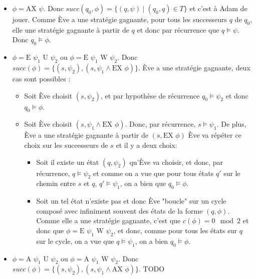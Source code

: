 \documentclass[10pt,a4paper]{article}
\begin{document}
\begin{itemize}
\item $\phi = \mbox{AX } \psi$. Donc $succ(q_0, \phi) = \{ (q, \psi) \mid (q_0,q) \in T \} $ et c'est à Adam de jouer. Comme Ève a une stratégie gagnante, pour tous les successeurs $q$ de $q_0$, elle une stratégie gagnante à partir de $q$ et donc par récurrence que $q \vDash \psi$. Donc $q_0 \vDash \phi$.

\item $\phi = \mbox{E } \psi_1 \mbox{ U } \psi_2$ ou $\phi = \mbox{E } \psi_1 \mbox{ W } \psi_2$. Donc $succ(\phi) = \{ (s,\psi_2), (s, \psi_1 \land \mbox{EX } \phi) \}$. Ève a une stratégie gagnante, deux cas sont possibles :
\begin{itemize}
	\item Soit Ève choisit $(s,\psi_2)$, et par hypothèse de récurrence $q_0 \vDash \psi_2$ et donc $q_0 \vDash \phi$.
	\item Soit Ève choisit $(s, \psi_1 \land \mbox{EX } \phi)$. Donc, par récurrence, $s \vDash \psi_1$. De plus, Ève a une stratégie gagnante à partir de $(s,\mbox{EX } \phi)$
	Ève va répéter ce choix sur les successeurs de $s$ et il y a deux choix:
	\begin{itemize}
		\item Soit il existe un état $(q,\psi_2)$ qu'Ève va choisir, et donc, par récurrence, $q \vDash \psi_2$ et comme on a vue que pour tous états $q'$ sur le chemin entre $s$ et $q$, $q' \vDash \psi_1$, on a bien que $q_0 \vDash \phi$.
		\item Soit un tel état n'existe pas et donc Ève "boucle" sur un cycle composé avec infiniment souvent des états de la forme $(q,\phi)$. Comme elle a une stratégie gagnante, c'est que $c(\phi) = 0 \mod 2$ et donc que $\phi = \mbox{E } \psi_1 \mbox{ W } \psi_2 $, et donc, comme pour tous les états sur $q$ sur le cycle, on a vue que $q \vDash \psi_1$, on a bien $q_0 \vDash \phi$.
	\end{itemize}
\end{itemize}

\item $\phi = \mbox{A } \psi_1 \mbox{ U } \psi_2$ ou $\phi = \mbox{A } \psi_1 \mbox{ W } \psi_2$. Donc $succ(\phi) = \{ (s,\psi_2), (s, \psi_1 \land \mbox{AX } \phi) \}$. TODO
\end{itemize}
\end{document}
